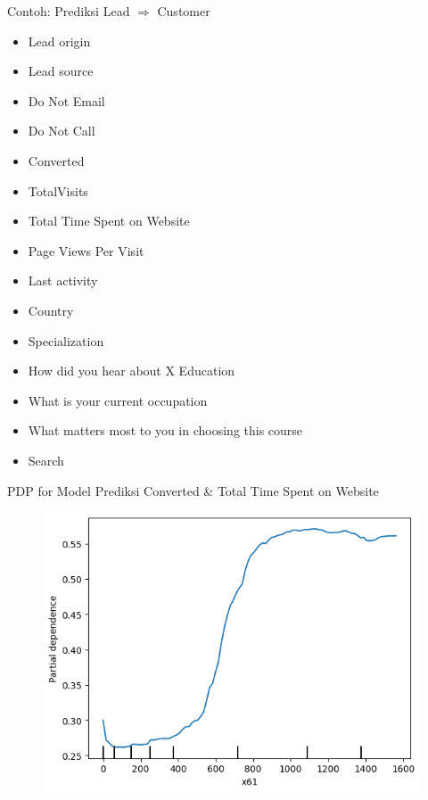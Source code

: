 \documentclass[aspectratio=169]{beamer}
\begin{document}
\begin{frame}{Contoh: Prediksi Lead $\Rightarrow$ Customer}
	\begin{multicols}{2} 
		\begin{itemize}
			\item  \footnotesize Lead origin
			\item  \footnotesize Lead source
			\item  \footnotesize Do Not Email
			\item  \footnotesize Do Not Call
			\item  \footnotesize Converted
			\item  \footnotesize TotalVisits
			\item  \footnotesize Total Time Spent on Website
		\end{itemize}
		\columnbreak
		\begin{itemize}
			\item  \footnotesize Page Views Per Visit
			\item  \footnotesize Last activity
			\item  \footnotesize Country
			\item  \footnotesize Specialization
			\item  \footnotesize How did you hear about X Education
			\item  \footnotesize What is your current occupation
			\item  \footnotesize What matters most to you in choosing this course
			\item  \footnotesize Search
		\end{itemize}
	\end{multicols}
\end{frame}

\begin{frame}{PDP for Model Prediksi Converted \& Total Time Spent on Website}
		\begin{figure}[!ht]
		\centering
		\includegraphics[scale=.55]{images/pdp-leads-1}
	\end{figure}
\end{frame}
\end{document}
